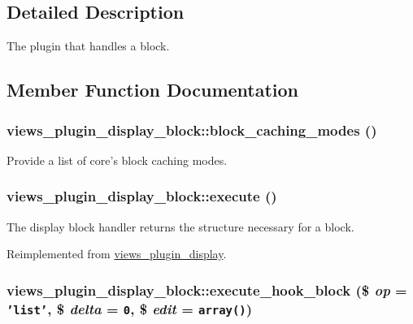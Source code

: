 \subsection{Detailed Description}
The plugin that handles a block. 

\subsection{Member Function Documentation}
\hypertarget{classviews__plugin__display__block_c5a9a1d276df4c6a01a3076be5e4f0aa}{
\subsubsection[{block\_\-caching\_\-modes}]{\setlength{\rightskip}{0pt plus 5cm}views\_\-plugin\_\-display\_\-block::block\_\-caching\_\-modes ()}}
\label{classviews__plugin__display__block_c5a9a1d276df4c6a01a3076be5e4f0aa}


Provide a list of core's block caching modes. \hypertarget{classviews__plugin__display__block_d673f5b3462304a522ead4293a8f7cef}{
\subsubsection[{execute}]{\setlength{\rightskip}{0pt plus 5cm}views\_\-plugin\_\-display\_\-block::execute ()}}
\label{classviews__plugin__display__block_d673f5b3462304a522ead4293a8f7cef}


The display block handler returns the structure necessary for a block. 

Reimplemented from \hyperlink{classviews__plugin__display_f99c4a303d3e409ab7b14c6cfcd3a1d8}{views\_\-plugin\_\-display}.\hypertarget{classviews__plugin__display__block_ff736419764b181899a2dee45a81291e}{
\subsubsection[{execute\_\-hook\_\-block}]{\setlength{\rightskip}{0pt plus 5cm}views\_\-plugin\_\-display\_\-block::execute\_\-hook\_\-block (\$ {\em op} = {\tt 'list'}, \/  \$ {\em delta} = {\tt 0}, \/  \$ {\em edit} = {\tt array()})}}
\label{classviews__plugin__display__block_ff736419764b181899a2dee45a81291e}


